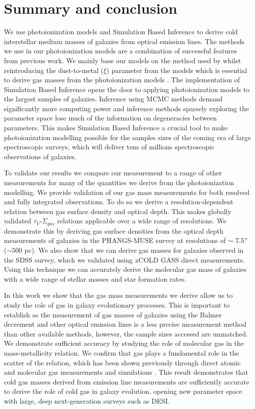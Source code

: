 \documentclass[fleqn,usenatbib]{mnras}
\begin{document}
\section{Summary and conclusion}
\label{sec:conclusion}
We use photoionization models and Simulation Based Inference to derive cold interstellar medium masses of galaxies from optical emission lines. The methods we use in our photoionization models are a combination of successful features from previous work. We mainly base our models on the method used by \cite{byler2017} whilst reintroducing the dust-to-metal ($\xi$) parameter from the \cite{charlot2001} models which is essential to derive gas masses from the photoionization models \citep{brinchmann2013}. The implementation of Simulation Based Inference opens the door to applying photoionization models to the largest samples of galaxies. Inference using MCMC methods demand significantly more computing power and inference methods sparsely exploring the parameter space lose much of the information on degeneracies between parameters. This makes Simulation Based Inference a crucial tool to make photoionization modelling possible for the samples sizes of the coming era of large spectroscopic surveys, which will deliver tens of millions spectroscopic observations of galaxies.

To validate our results we compare our measurement to a range of other measurements for many of the quantities we derive from the photoionization modelling. We provide validation of our gas mass measurements for both resolved and fully integrated observations. To do so we derive a resolution-dependent relation between gas surface density and optical depth. This makes globally validated $\tau_{V}$-$\Sigma_{gas}$ relations applicable over a wide range of resolutions. We demonstrate this by deriving gas surface densities from the optical depth measurements of galaxies in the PHANGS-MUSE survey at resolutions of $\sim7.5"$ ($\sim$500 pc). We also show that we can derive gas masses for galaxies observed in the SDSS survey, which we validated using xCOLD GASS direct measurements. Using this technique we can accurately derive the molecular gas mass of galaxies with a wide range of stellar masses and star formation rates. 

In this work we show that the gas mass measurements we derive allow us to study the role of gas in galaxy evolutionary processes. This is important to establish as the measurement of gas masses of galaxies using the Balmer decrement and other optical emission lines is a less precise measurement method than other available methods, however, the sample sizes accessed are unmatched. We demonstrate sufficient accuracy by studying the role of molecular gas in the mass-metallicity relation. We confirm that gas plays a fundamental role in the scatter of the relation, which has been shown previously through direct atomic and molecular gas measurements and simulations \citep[e.g.][]{bothwell2013, bothwell2016, loon2021}. This result demonstrates that cold gas masses derived from emission line measurements are sufficiently accurate to derive the role of cold gas in galaxy evolution, opening new parameter space with large, deep next-generation surveys such as DESI. 
\end{document}
